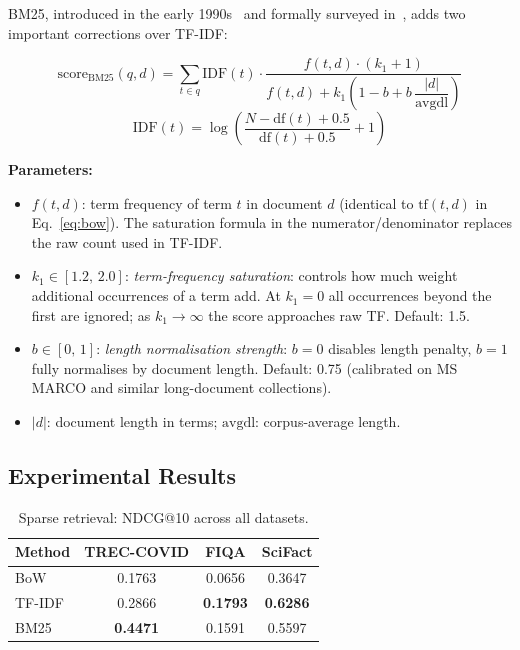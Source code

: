 \documentclass[12pt, a4paper]{article}
\makeatletter
\newcommand{\ndcg}{NDCG@10}
\newcommand{\tc}{TREC-COVID}
\newcommand{\fiqa}{FIQA}
\newcommand{\scifact}{SciFact}
\makeatother
\begin{document}
BM25, introduced in the early 1990s~\citep{robertson1994simple} and
formally surveyed in~\citet{robertson2009probabilistic}, adds two important
corrections over TF-IDF:

\begin{equation}
  \text{score}_{\text{BM25}}(q, d)
    = \sum_{t \in q} \text{IDF}(t)
      \cdot \frac{f(t,d) \cdot (k_1 + 1)}
                 {f(t,d) + k_1 \!\left(1 - b + b\,\dfrac{|d|}{\text{avgdl}}\right)}
  \label{eq:bm25}
\end{equation}
\begin{equation}
  \text{IDF}(t) = \log\!\left(\frac{N - \text{df}(t) + 0.5}{\text{df}(t) + 0.5} + 1\right)
  \label{eq:bm25_idf}
\end{equation}

\noindent\textbf{Parameters:}
\begin{itemize}
  \item $f(t, d)$: term frequency of term $t$ in document $d$ (identical to
        $\text{tf}(t,d)$ in Eq.~\ref{eq:bow}).  The saturation formula in the
        numerator/denominator replaces the raw count used in TF-IDF.
  \item $k_1 \in [1.2,\, 2.0]$: \emph{term-frequency saturation}:
        controls how much weight additional occurrences of a term add.
        At $k_1 = 0$ all occurrences beyond the first are ignored;
        as $k_1 \to \infty$ the score approaches raw TF.  Default: 1.5.
  \item $b \in [0,\, 1]$: \emph{length normalisation strength}:
        $b = 0$ disables length penalty, $b = 1$ fully normalises by document
        length.  Default: 0.75 (calibrated on MS MARCO and similar long-document
        collections).
  \item $|d|$: document length in terms; $\text{avgdl}$: corpus-average length.
\end{itemize}

\subsection{Experimental Results}

\begin{table}[h]
\centering
\caption{Sparse retrieval: \ndcg{} across all datasets.}
\label{tab:sparse}
\begin{tabular}{lccc}
\toprule
\textbf{Method} & \textbf{\tc{}} & \textbf{\fiqa{}} & \textbf{\scifact{}} \\
\midrule
BoW             & 0.1763 & 0.0656 & 0.3647 \\
TF-IDF          & 0.2866 & \textbf{0.1793} & \textbf{0.6286} \\
BM25            & \textbf{0.4471} & 0.1591 & 0.5597 \\
\bottomrule
\end{tabular}
\end{table}
\end{document}
